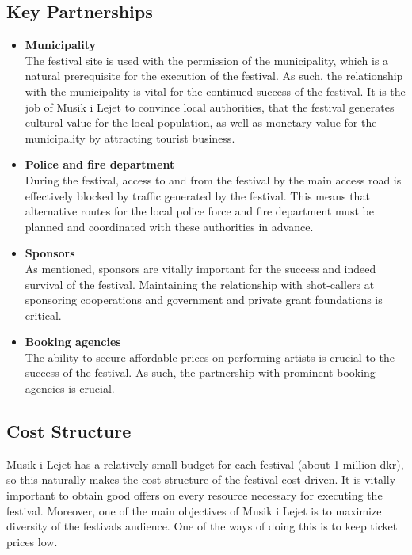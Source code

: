 \subsection{Key Partnerships} %
\label{sub:key_partnerships}
\begin{itemize}
	\item \textbf{Municipality}\\
	The festival site is used with the permission of the municipality, which is a natural prerequisite for the execution of the festival. As such, the relationship with the municipality is vital for the continued success of the festival. It is the job of Musik i Lejet to convince local authorities, that the festival generates cultural value for the local population, as well as monetary value for the municipality  by attracting tourist business.
	\item \textbf{Police and fire department}\\
	During the festival, access to and from the festival by the main access road is effectively blocked by traffic generated by the festival. This means that alternative routes for the local police force and fire department must be planned and coordinated with these authorities in advance.
	\item \textbf{Sponsors}\\
	As mentioned, sponsors are vitally important for the success and indeed survival of the festival. Maintaining the relationship with shot-callers at sponsoring cooperations and government and private grant foundations is critical.
	\item \textbf{Booking agencies}\\
	The ability to secure affordable prices on performing artists is crucial to the success of the festival. As such, the partnership with prominent booking agencies is crucial.
\end{itemize}

\subsection{Cost Structure} %
\label{sub:cost_structure}
Musik i Lejet has a relatively small budget for each festival (about 1 million dkr), so this naturally makes the cost structure of the festival cost driven. It is vitally important to obtain good offers on every resource necessary for executing the festival. Moreover, one of the main objectives of Musik i Lejet is to maximize diversity of the festivals audience. One of the ways of doing this is to keep ticket prices low.